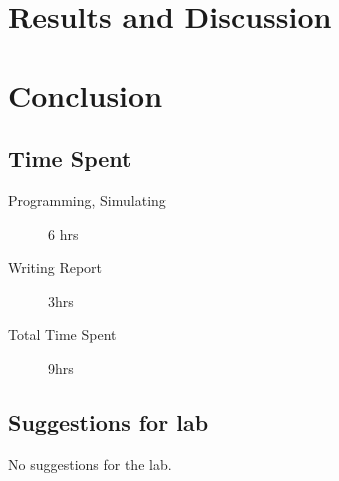 \documentclass[11pt]{article}
\begin{document}
\clearpage

\clearpage

\section{Results and Discussion}



\section{Conclusion}

\subsection{Time Spent}

\begin{description}
	\item[Programming, Simulating] 6 hrs
 	\item[Writing Report] 3hrs
	\item[Total Time Spent] 9hrs
\end{description}

\subsection{Suggestions for lab}

No suggestions for the lab.
\end{document}

